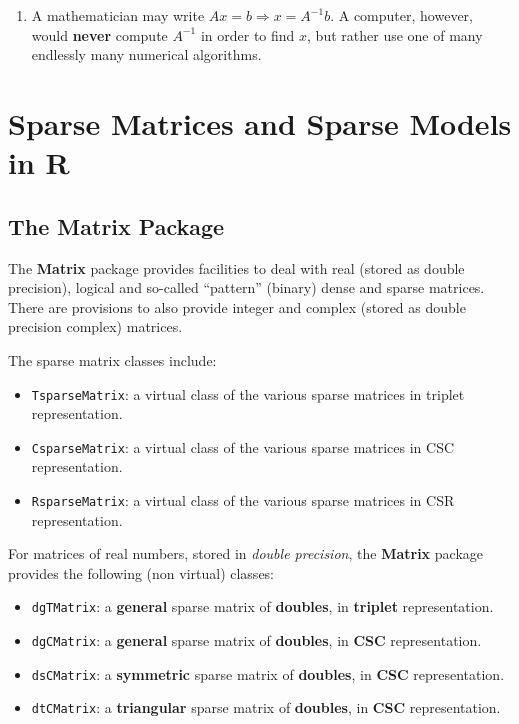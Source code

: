 \documentclass[]{book}
\providecommand{\tightlist}{%
  \setlength{\itemsep}{0pt}\setlength{\parskip}{0pt}}
\theoremstyle{definition}
\theoremstyle{definition}
\theoremstyle{remark}
\begin{document}
\begin{enumerate}
\def\labelenumi{\arabic{enumi}.}
\tightlist
\item
  A mathematician may write \(Ax=b \Rightarrow x=A^{-1}b\). A computer,
  however, would \textbf{never} compute \(A^{-1}\) in order to find
  \(x\), but rather use one of many endlessly many numerical algorithms.
\end{enumerate}

\section{Sparse Matrices and Sparse Models in
R}\label{sparse-matrices-and-sparse-models-in-r}

\subsection{The Matrix Package}\label{the-matrix-package}

The \textbf{Matrix} package provides facilities to deal with real
(stored as double precision), logical and so-called ``pattern'' (binary)
dense and sparse matrices. There are provisions to also provide integer
and complex (stored as double precision complex) matrices.

The sparse matrix classes include:

\begin{itemize}
\tightlist
\item
  \texttt{TsparseMatrix}: a virtual class of the various sparse matrices
  in triplet representation.
\item
  \texttt{CsparseMatrix}: a virtual class of the various sparse matrices
  in CSC representation.
\item
  \texttt{RsparseMatrix}: a virtual class of the various sparse matrices
  in CSR representation.
\end{itemize}

For matrices of real numbers, stored in \emph{double precision}, the
\textbf{Matrix} package provides the following (non virtual) classes:

\begin{itemize}
\tightlist
\item
  \texttt{dgTMatrix}: a \textbf{general} sparse matrix of
  \textbf{doubles}, in \textbf{triplet} representation.
\item
  \texttt{dgCMatrix}: a \textbf{general} sparse matrix of
  \textbf{doubles}, in \textbf{CSC} representation.
\item
  \texttt{dsCMatrix}: a \textbf{symmetric} sparse matrix of
  \textbf{doubles}, in \textbf{CSC} representation.
\item
  \texttt{dtCMatrix}: a \textbf{triangular} sparse matrix of
  \textbf{doubles}, in \textbf{CSC} representation.
\end{itemize}
\end{document}
